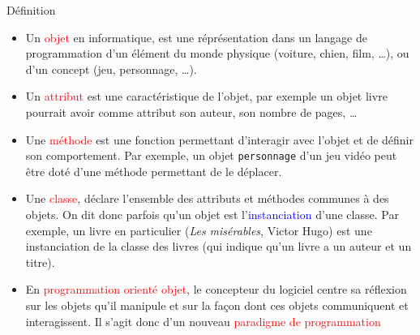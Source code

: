 \documentclass[10pt]{beamer}
\begin{document}
\begin{frame}
	\mframe{\POO}
	\begin{alertblock}{Définition}
		\begin{itemize}
			\item<1-> Un \textcolor{red}{objet} en informatique, est une réprésentation dans un langage de programmation d'un élément du monde  physique (voiture, chien, film, \dots),  ou d'un concept (jeu, personnage, \dots).
			\item<2-> Un \textcolor{red}{attribut} est une caractéristique de l'objet, par exemple un objet livre pourrait avoir comme attribut son auteur, son nombre de pages, \dots
			\item<3-> Une \textcolor{red}{méthode} est une fonction permettant d'interagir avec l'objet et de définir son comportement. Par exemple, un objet {\tt personnage} d'un jeu vidéo peut être doté d'une méthode permettant de le déplacer.
			\item<4-> Une \textcolor{red}{classe}, déclare l'ensemble des attributs et méthodes communes à des objets. On dit donc parfois qu'un objet est l'\textcolor{blue}{instanciation} d'une classe. Par exemple, un livre en particulier (\textit{Les misérables}, Victor Hugo) est une instanciation de la classe des livres (qui indique qu'un livre a un auteur et un titre).
			\item<5-> En \textcolor{red}{programmation orienté objet}, le concepteur du logiciel centre sa réflexion sur les objets qu'il manipule et sur la façon dont ces objets communiquent et interagissent. Il s'agit donc d'un nouveau \textcolor{red}{paradigme de programmation}
		\end{itemize}
	\end{alertblock}
\end{frame}
\end{document}
